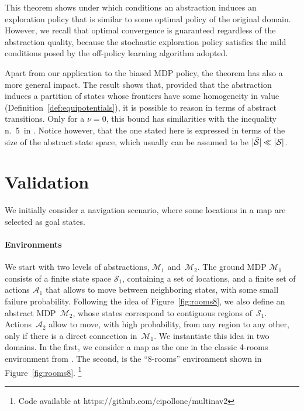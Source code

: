 \documentclass[letterpaper]{article} %
\theoremstyle{plain}
\theoremstyle{definition}
\theoremstyle{remark}
\DeclarePairedDelimiter{\abs}{\lvert}{\rvert}
\newcommand{\SetSym}[1]{\mathcal{#1}}
\newcommand{\States}{\SetSym{S}}
\newcommand{\Actions}{\SetSym{A}}
\newcommand{\Model}{\SetSym{M}}
\newcommand{\Abst}[1]{\bar{#1}}
\newcommand{\PHomogeneity}{\nu}
\begin{document}
This theorem shows under which conditions an abstraction induces an exploration policy that is similar to some optimal policy of the original domain.
However, we recall that optimal convergence is guaranteed regardless of the abstraction quality, because the stochastic exploration policy satisfies the mild conditions posed by the off-policy learning algorithm adopted.

Apart from our application to the biased MDP policy, the theorem has also a more general impact.
The result shows that, provided that the abstraction induces a partition of states whose frontiers have some homogeneity in value (Definition~\ref{def:equipotentials}), it is possible to reason in terms of abstract transitions.
Only for a $\PHomogeneity=0$, this bound has similarities with the inequality n.~5\ in
\cite{abel_2020_ValuePreserving}. Notice however, that the one stated here is expressed
in terms of the size of the abstract state space, which usually can
be assumed to be $\abs{\Abst\States} \ll \abs{\States}$.


\section{Validation}
\label{sec:validation}

We initially consider a navigation scenario, where some locations in a map are selected as goal states.

\paragraph{Environments}
We start with two levels of abstractions, $\Model_1$ and~$\Model_2$.
The ground MDP $\Model_1$ consists of a finite state space $\States_1$,
containing a set of locations, and a finite set of actions $\Actions_1$ that
allows to move between neighboring states, with some small failure probability.
Following the idea of Figure~\ref{fig:rooms8}, we also define an abstract MDP~$\Model_2$,
whose states correspond to contiguous regions of~$\States_1$.
Actions~$\Actions_2$ allow to move, with high probability, from any region to any other, only if there is a direct connection in~$\Model_1$.
We instantiate this idea in two domains. In the first, we consider a map as the one in the classic 4-rooms environment from \cite{sutton1999between}.
The second, is the ``8-rooms'' environment shown in Figure~\ref{fig:rooms8}.%
\footnote{Code available at {https://github.com/cipollone/multinav2}}
\end{document}
